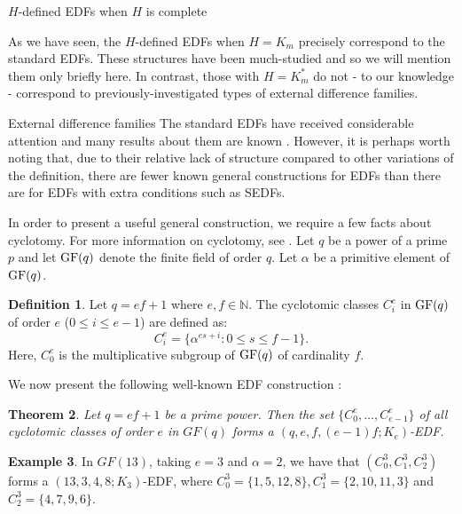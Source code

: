 \documentclass[12pt, a4paper]{article}
\newtheorem{theorem}{Theorem}[section]
\theoremstyle{definition}
\newtheorem{example}[theorem]{Example}
\newtheorem{definition}[theorem]{Definition}
\begin{document}
\begin{section}{$H$-defined EDFs when $H$ is complete}

As we have seen, the $H$-defined EDFs when $H=K_m$ precisely correspond to the standard EDFs.  These structures have been much-studied and so we will mention them only briefly here.  In contrast, those with $H=K_m^*$ do not - to our knowledge - correspond to previously-investigated types of external difference families.

\begin{subsection}{External difference families}
The standard EDFs have received considerable attention and many results about them are known \cite{HucPat, PatSti1}. However, it is perhaps worth noting that, due to their relative lack of structure compared to other variations of the definition, there are fewer known general constructions for EDFs than there are for EDFs with extra conditions such as SEDFs.

In order to present a useful general construction, we require a few facts about cyclotomy.  For more information on cyclotomy, see \cite{Sto}.  Let $q$ be a power of a prime $p$ and let $ {\rm GF}(q)$ denote the finite field of order $q$.  Let $\alpha$ be a primitive element of $ {\rm GF}(q)$.  

\begin{definition}\label{def:cclass}
Let $q=ef+1$ where $e,f \in \mathbb{N}$.  The cyclotomic classes $C_i^e$ in $ {\rm GF}(q)$ of order $e$ ($0 \leq i \leq e-1$) are defined as:
$$ C_i^e=\{\alpha^{es+i}: 0 \leq s \leq f-1\}.$$
Here, $C_0^e$ is the multiplicative subgroup of $ {\rm GF}(q)$ of cardinality $f$.
\end{definition}

We now present the following well-known EDF construction \cite{ChaDin, DavHucMul}:

\begin{theorem}\label{thm:cycEDF}
Let $q=ef+1$ be a prime power.  Then the set $\{C_0^e, \ldots, C_{e-1}^e\}$ of all cyclotomic classes of order $e$ in $GF(q)$ forms a $(q,e,f,(e-1)f;K_e)$-EDF. 
\end{theorem}

\begin{example}\label{ex:K_3EDF}
In $GF(13)$, taking $e=3$ and $\alpha=2$, we have that $(C_0^3,C_1^3,C_2^3)$  forms a $(13,3,4,8;K_3)$-EDF, where $C_0^3=\{1,5,12,8\}, C_1^3=\{2,10,11,3\}$ and $C_2^3=\{4,7,9,6\}$.
\end{example}

\end{subsection}


\end{section}
\end{document}
